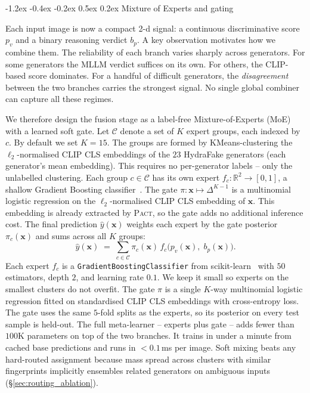 \documentclass[10pt,twocolumn,letterpaper]{article}
\makeatletter
\renewcommand\subsection{\@startsection{subsection}{2}{\z@}%
  {-1.2ex \@plus -0.4ex \@minus -0.2ex}%
  {0.5ex \@plus 0.2ex}%
  {\normalfont\normalsize\bfseries}}
\newcommand{\vfive}{\textsc{Pact}}
\makeatother
\begin{document}
\subsection{Mixture of Experts and gating}
\label{sec:stacking}
\par Each input image is now a compact 2-d signal: a continuous discriminative score $p_v$ and a binary reasoning verdict $b_p$. A key observation motivates how we combine them. The reliability of each branch varies sharply across generators. For some generators the MLLM verdict suffices on its own. For others, the CLIP-based score dominates. For a handful of difficult generators, the \emph{disagreement} between the two branches carries the strongest signal. No single global combiner can capture all these regimes.
\par We therefore design the fusion stage as a label-free Mixture-of-Experts (MoE) with a learned soft gate.
Let $\mathcal{C}$ denote a set of $K$ expert groups, each indexed by $c$. By default we set $K{=}15$. The groups are formed by KMeans-clustering the $\ell_2$-normalised CLIP CLS embeddings of the $23$ HydraFake generators (each generator's mean embedding). This requires no per-generator labels -- only the unlabelled clustering. Each group $c\!\in\!\mathcal{C}$ has its own expert $f_c:\mathbb{R}^2\!\to\![0,1]$, a shallow Gradient Boosting classifier~\cite{gbm}. The gate $\pi:\mathbf{x}\!\mapsto\!\Delta^{K-1}$ is a multinomial logistic regression on the $\ell_2$-normalised CLIP CLS embedding of $\mathbf{x}$. This embedding is already extracted by \vfive{}, so the gate adds no additional inference cost. The final prediction $\hat{y}(\mathbf{x})$ weights each expert by the gate posterior $\pi_c(\mathbf{x})$ and sums across all $K$ groups:
\begin{equation}
\label{eq:moe}
\hat{y}(\mathbf{x}) \;=\; \sum_{c\in\mathcal{C}} \pi_c(\mathbf{x})\,f_c\!\bigl(p_v(\mathbf{x}),\; b_p(\mathbf{x})\bigr).
\end{equation}
Each expert $f_c$ is a \texttt{GradientBoostingClassifier} from scikit-learn~\cite{sklearn} with $50$ estimators, depth $2$, and learning rate $0.1$. We keep it small so experts on the smallest clusters do not overfit. The gate $\pi$ is a single $K$-way multinomial logistic regression fitted on standardised CLIP CLS embeddings with cross-entropy loss. The gate uses the same $5$-fold splits as the experts, so its posterior on every test sample is held-out. The full meta-learner -- experts plus gate -- adds fewer than $100$K parameters on top of the two branches. It trains in under a minute from cached base predictions and runs in $<0.1$\,ms per image. Soft mixing beats any hard-routed assignment because mass spread across clusters with similar fingerprints implicitly ensembles related generators on ambiguous inputs (\S\ref{sec:routing_ablation}).
\end{document}
